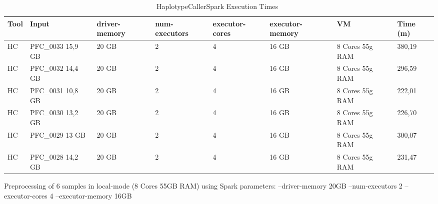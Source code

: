 \begin{table}[h]
	\caption{HaplotypeCallerSpark Execution Times~\label{HC_6_16}}
	\begin{center}
		\begin{tabular}{| m{5em} | m{5em} | m{3em} | m{4em} | m{4em} | m{5em} | m{4.5em} | m{3em} |}
    		\hline
    		Tool & Input & driver-memory & num-executors & executor-cores & executor-memory & VM & Time (m) \\ \hline
		    HC & PFC\_0033 15,9 GB & 20 GB & 2 & 4 & 16 GB & 8 Cores 55g RAM & 380,19 \\ \hline
			HC & PFC\_0032 14,4 GB & 20 GB & 2 & 4 & 16 GB & 8 Cores 55g RAM  & 296,59 \\ \hline
			HC & PFC\_0031 10,8 GB & 20 GB & 2 & 4 & 16 GB & 8 Cores 55g RAM  & 222,01 \\ \hline
			HC & PFC\_0030 13,2 GB& 20 GB & 2 & 4 & 16 GB & 8 Cores 55g RAM  & 226,70 \\ \hline
			HC & PFC\_0029 13 GB & 20 GB & 2 & 4 & 16 GB & 8 Cores 55g RAM  & 300,07 \\ \hline
			HC & PFC\_0028 14,2 GB & 20 GB & 2 & 4 & 16 GB & 8 Cores 55g RAM  & 231,47 \\ \hline
    	\end{tabular}
    \end{center}
\end{table}
\begin{chart}[!ht]
\centering
{}
\caption{Preprocessing of 6 samples in local-mode (8 Cores 55GB RAM) using Spark parameters: --driver-memory 20GB	--num-executors	2 --executor-cores	4 --executor-memory 16GB}\label{cht:preprocessing16}
\end{chart}
